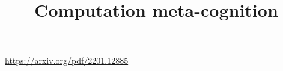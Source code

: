 \documentclass[a4paper]{article}
\title{Computation meta-cognition}
\date{}
\begin{document}
    \maketitle
    \url{https://arxiv.org/pdf/2201.12885}
\end{document}
